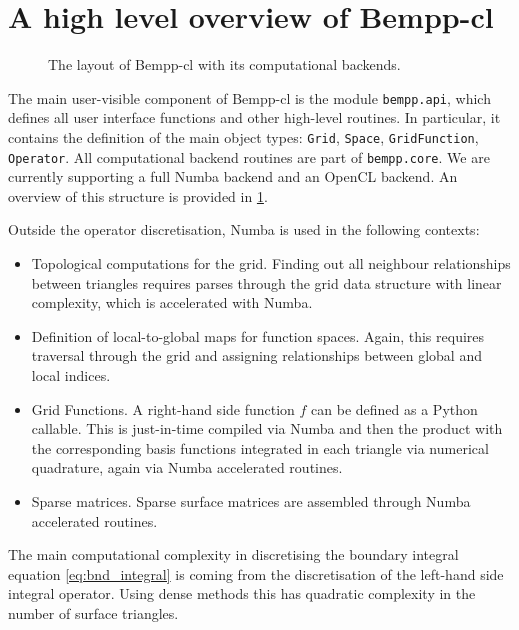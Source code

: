 \section{A high level overview of Bempp-cl}

\begin{figure}
	\centering
    
	\caption{The layout of Bempp-cl with its computational backends.}
	\label{fig:overview}
\end{figure}

The main user-visible component of Bempp-cl is the module \texttt{bempp.api}, which defines all user interface functions and other high-level routines. In particular, it contains the definition of the main object types: \texttt{Grid}, \texttt{Space}, \texttt{GridFunction}, \texttt{Operator}. All computational backend routines are part of \texttt{bempp.core}. We are currently supporting a full Numba backend and an OpenCL backend. An overview of this structure is provided in \cref{fig:overview}.

Outside the operator discretisation, Numba is used in the following contexts:
\begin{itemize}
	\item Topological computations for the grid. Finding out all neighbour relationships between triangles requires parses through the grid data structure with linear complexity, which is accelerated with Numba.
	\item Definition of local-to-global maps for function spaces. Again, this requires traversal through the grid and assigning relationships between global and local indices.
	\item Grid Functions. A right-hand side function $f$ can be defined as a Python callable. This is just-in-time compiled via Numba and then the product with the corresponding basis functions integrated in each triangle via numerical quadrature, again via Numba accelerated routines.
	\item Sparse matrices. Sparse surface matrices are assembled through Numba accelerated routines.
\end{itemize}

The main computational complexity in discretising the boundary integral equation \cref{eq:bnd_integral} is coming from the discretisation of the left-hand side integral operator. Using dense methods this has quadratic complexity in the number of surface triangles.

